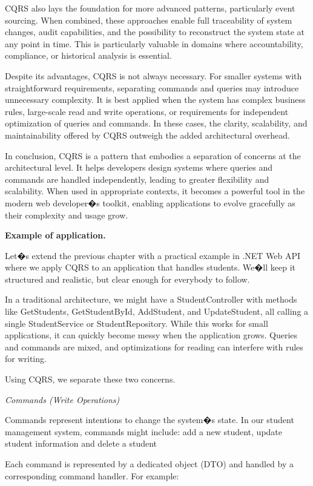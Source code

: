 CQRS also lays the foundation for more advanced patterns, particularly event sourcing. When combined, these approaches enable full traceability of system changes, audit capabilities, and the possibility to reconstruct the system state at any point in time. This is particularly valuable in domains where accountability, compliance, or historical analysis is essential.

Despite its advantages, CQRS is not always necessary. For smaller systems with straightforward requirements, separating commands and queries may introduce unnecessary complexity. It is best applied when the system has complex business rules, large-scale read and write operations, or requirements for independent optimization of queries and commands. In these cases, the clarity, scalability, and maintainability offered by CQRS outweigh the added architectural overhead.

In conclusion, CQRS is a pattern that embodies a separation of concerns at the architectural level. It helps developers design systems where queries and commands are handled independently, leading to greater flexibility and scalability. When used in appropriate contexts, it becomes a powerful tool in the modern web developer�s toolkit, enabling applications to evolve gracefully as their complexity and usage grow. 


\medskip

\textbf{Example of application.}

Let�s extend the previous chapter with a practical example in .NET Web API where we apply CQRS to an application that handles students. We�ll keep it structured and realistic, but clear enough for everybody to follow.

In a traditional architecture, we might have a StudentController with methods like GetStudents, GetStudentById, AddStudent, and UpdateStudent, all calling a single StudentService or StudentRepository. While this works for small applications, it can quickly become messy when the application grows. Queries and commands are mixed, and optimizations for reading can interfere with rules for writing.

Using CQRS, we separate these two concerns.

\textit{Commands (Write Operations)}

Commands represent intentions to change the system�s state. In our student management system, commands might include: add a new student, update student information and delete a student

Each command is represented by a dedicated object (DTO) and handled by a corresponding command handler. For example:

